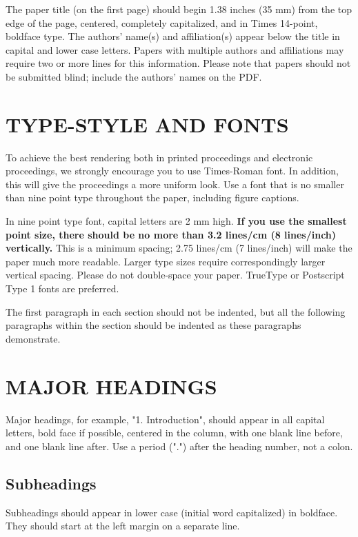 \documentclass{article}
\begin{document}
The paper title (on the first page) should begin 1.38 inches (35 mm) from the
top edge of the page, centered, completely capitalized, and in Times 14-point,
boldface type.  The authors' name(s) and affiliation(s) appear below the title
in capital and lower case letters.  Papers with multiple authors and
affiliations may require two or more lines for this information. Please note
that papers should not be submitted blind; include the authors' names on the
PDF.

\section{TYPE-STYLE AND FONTS}
\label{sec:typestyle}

To achieve the best rendering both in printed proceedings and electronic proceedings, we
strongly encourage you to use Times-Roman font.  In addition, this will give
the proceedings a more uniform look.  Use a font that is no smaller than nine
point type throughout the paper, including figure captions.

In nine point type font, capital letters are 2 mm high.  {\bf If you use the
smallest point size, there should be no more than 3.2 lines/cm (8 lines/inch)
vertically.}  This is a minimum spacing; 2.75 lines/cm (7 lines/inch) will make
the paper much more readable.  Larger type sizes require correspondingly larger
vertical spacing.  Please do not double-space your paper.  TrueType or
Postscript Type 1 fonts are preferred.

The first paragraph in each section should not be indented, but all the
following paragraphs within the section should be indented as these paragraphs
demonstrate.

\section{MAJOR HEADINGS}
\label{sec:majhead}

Major headings, for example, "1. Introduction", should appear in all capital
letters, bold face if possible, centered in the column, with one blank line
before, and one blank line after. Use a period (".") after the heading number,
not a colon.

\subsection{Subheadings}
\label{ssec:subhead}

Subheadings should appear in lower case (initial word capitalized) in
boldface.  They should start at the left margin on a separate line.
\end{document}
